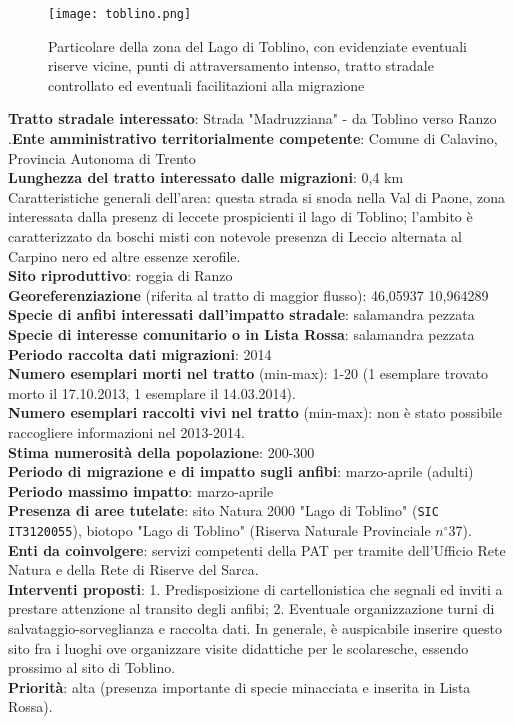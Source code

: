 \documentclass[11pt,a4paper,twoside]{memoir}
\begin{document}
\begin{figure}[H]
\label{fig:map_toblino}
\centering
  \texttt{[image: toblino.png]}
\caption{Particolare della zona del Lago di Toblino, con evidenziate eventuali riserve vicine, punti di attraversamento intenso, tratto stradale controllato ed eventuali facilitazioni alla migrazione}
\end{figure}

\textbf{Tratto stradale interessato}: Strada "Madruzziana" - da Toblino verso Ranzo \\
.\textbf{Ente amministrativo territorialmente competente}: Comune di Calavino, Provincia Autonoma di Trento  \\
\textbf{Lunghezza del tratto interessato dalle migrazioni}: 0,4 km \\
Caratteristiche generali dell’area: questa strada si snoda nella Val di Paone, zona interessata dalla presenz di leccete prospicienti il lago di Toblino; l'ambito è caratterizzato da boschi misti con notevole presenza di Leccio alternata al Carpino nero ed altre essenze xerofile. \\
\textbf{Sito riproduttivo}: roggia di Ranzo \\
\textbf{Georeferenziazione} (riferita al tratto di maggior flusso): 46,05937 10,964289 \\
\textbf{Specie di anfibi interessati dall’impatto stradale}: salamandra pezzata \\
\textbf{Specie di interesse comunitario o in Lista Rossa}: salamandra pezzata \\
\textbf{Periodo raccolta dati migrazioni}: 2014 \\
\textbf{Numero esemplari morti nel tratto} (min-max): 1-20 (1 esemplare trovato morto il 17.10.2013, 1 esemplare il 14.03.2014). \\
\textbf{Numero esemplari raccolti vivi nel tratto} (min-max): non è stato possibile raccogliere informazioni nel 2013-2014.  \\ 
\textbf{Stima numerosità della popolazione}: 200-300 \\
\textbf{Periodo di migrazione e di impatto sugli anfibi}: marzo-aprile (adulti) \\
\textbf{Periodo massimo impatto}: marzo-aprile \\
\textbf{Presenza di aree tutelate}: sito Natura 2000 "Lago di Toblino" (\texttt{SIC IT3120055}), biotopo "Lago di Toblino" (Riserva Naturale Provinciale $n^{\circ}$37). \\
\textbf{Enti da coinvolgere}: servizi competenti della PAT per tramite dell’Ufficio Rete Natura e della Rete di Riserve del Sarca. \\
\textbf{Interventi proposti}: 1. Predisposizione di cartellonistica che segnali ed inviti a prestare attenzione al transito degli anfibi; 2. Eventuale organizzazione turni di salvataggio-sorveglianza e raccolta dati. In generale, è auspicabile inserire questo sito fra i luoghi ove organizzare visite didattiche per le scolaresche, essendo prossimo al sito di Toblino. \\
\textbf{Priorità}: alta (presenza importante di specie minacciata e inserita in Lista Rossa). \\
 
\end{document}
